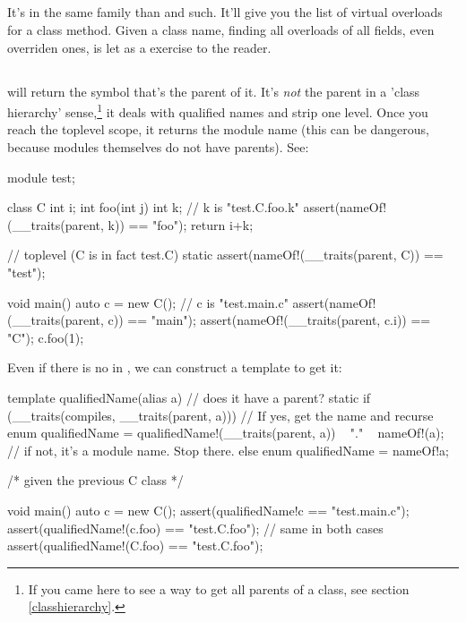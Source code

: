 
\subsection{}

It's in the same family than  and such. It'll give you the list of virtual overloads for a class method. Given a class name, finding all overloads of all fields, even overriden ones, is let as a exercise to the reader.

\subsection{}

 will return the symbol that's the parent of it. It's \emph{not} the parent in a 'class hierarchy' sense,\footnote{ If you came here to see a way to get all parents of a class, see section \ref{classhierarchy}.} it deals with qualified names and strip one level. Once you reach the toplevel scope, it returns the module name (this can be dangerous, because modules themselves do not have parents). See:

\begin{dcode}
module test;

class C
{
    int i;
    int foo(int j)
    {
        int k; // k is "test.C.foo.k"
        assert(nameOf!(__traits(parent, k)) == "foo");
        return i+k;
    }
}

// toplevel (C is in fact test.C)
static assert(nameOf!(__traits(parent, C)) == "test");

void main() 
{
    auto c = new C(); // c is "test.main.c"
    assert(nameOf!(__traits(parent, c)) == "main");
    assert(nameOf!(__traits(parent, c.i)) == "C");
    c.foo(1);
}
\end{dcode}

Even if there is no  in , we can construct a template to get it:

\begin{dcode}
template qualifiedName(alias a)
{
    // does it have a parent?
    static if (__traits(compiles, __traits(parent, a)))
    // If yes, get the name and recurse
        enum qualifiedName = qualifiedName!(__traits(parent, a)) 
                           ~  "." ~ nameOf!(a);
    // if not, it's a module name. Stop there.
    else
        enum qualifiedName = nameOf!a;
}

/* given the previous C class */

void main()
{
    auto c = new C();
    assert(qualifiedName!c == "test.main.c");
    assert(qualifiedName!(c.foo) == "test.C.foo"); // same in both cases
    assert(qualifiedName!(C.foo) == "test.C.foo");
}
\end{dcode}

